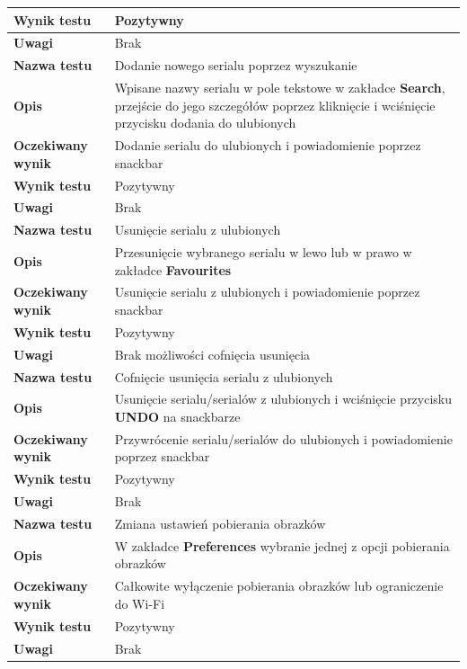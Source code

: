 \documentclass[10pt,a4paper]{article}
\begin{document}
\begin{tabularx}{\textwidth}{|l|X|}
	\hline
	\textbf{Wynik testu} & Pozytywny \\
	\hline
	\textbf{Uwagi} & Brak \\
	\hhline{==}
	\textbf{Nazwa testu} & Dodanie nowego serialu poprzez wyszukanie \\
	\hline
	\textbf{Opis} & Wpisane nazwy serialu w pole tekstowe w zakładce \textbf{Search}, przejście do jego szczegółów poprzez kliknięcie i wciśnięcie przycisku dodania do ulubionych \\
	\hline
	\textbf{Oczekiwany wynik} & Dodanie serialu do ulubionych i powiadomienie poprzez snackbar \\
	\hline
	\textbf{Wynik testu} & Pozytywny \\
	\hline
	\textbf{Uwagi} & Brak \\
	\hhline{==}
	\textbf{Nazwa testu} & Usunięcie serialu z ulubionych \\
	\hline
	\textbf{Opis} & Przesunięcie wybranego serialu w lewo lub w prawo w zakładce \textbf{Favourites} \\
	\hline
	\textbf{Oczekiwany wynik} & Usunięcie serialu z ulubionych i powiadomienie poprzez snackbar \\
	\hline
	\textbf{Wynik testu} & Pozytywny \\
	\hline
	\textbf{Uwagi} & Brak możliwości cofnięcia usunięcia \\
	\hline
	\textbf{Nazwa testu} & Cofnięcie usunięcia serialu z ulubionych \\
	\hline
	\textbf{Opis} & Usunięcie serialu/serialów z ulubionych i wciśnięcie przycisku \textbf{UNDO} na snackbarze \\
	\hline
	\textbf{Oczekiwany wynik} & Przywrócenie serialu/serialów do ulubionych i powiadomienie poprzez snackbar \\
	\hline
	\textbf{Wynik testu} & Pozytywny \\
	\hline
	\textbf{Uwagi} & Brak \\
	\hhline{==}
	\textbf{Nazwa testu} & Zmiana ustawień pobierania obrazków \\
	\hline
	\textbf{Opis} & W zakładce \textbf{Preferences} wybranie jednej z opcji pobierania obrazków \\
	\hline
	\textbf{Oczekiwany wynik} & Całkowite wyłączenie pobierania obrazków lub ograniczenie do Wi-Fi \\
	\hline
	\textbf{Wynik testu} & Pozytywny \\
	\hline
	\textbf{Uwagi} & Brak \\
	\hline
\end{tabularx}
\end{document}
